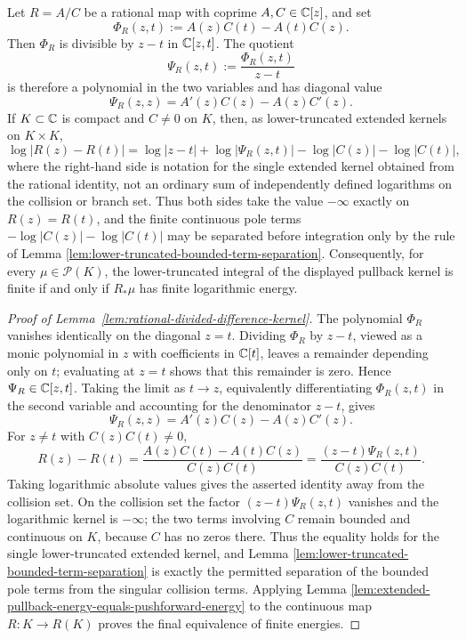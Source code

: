 \begin{lemma}\label{lem:rational-divided-difference-kernel}
Let \(R=A/C\) be a rational map with coprime \(A,C\in\mathbb{C}[z]\), and set
\[
\Phi_R(z,t):=A(z)C(t)-A(t)C(z).
\]
Then \(\Phi_R\) is divisible by \(z-t\) in \(\mathbb{C}[z,t]\).  The quotient
\[
\Psi_R(z,t):=\frac{\Phi_R(z,t)}{z-t}
\]
is therefore a polynomial in the two variables and has diagonal value
\[
\Psi_R(z,z)=A'(z)C(z)-A(z)C'(z).
\]
If \(K\subset\mathbb{C}\) is compact and \(C\ne0\) on \(K\), then, as lower-truncated extended kernels on \(K\times K\),
\[
\log|R(z)-R(t)|
=
\log|z-t|+\log|\Psi_R(z,t)|-
\log|C(z)|-\log|C(t)|,
\]
where the right-hand side is notation for the single extended kernel obtained from the rational identity, not an ordinary sum of independently defined logarithms on the collision or branch set.  Thus both sides take the value \(-\infty\) exactly on \(R(z)=R(t)\), and the finite continuous pole terms \(-\log|C(z)|-\log|C(t)|\) may be separated before integration only by the rule of Lemma \ref{lem:lower-truncated-bounded-term-separation}.  Consequently, for every \(\mu\in\mathcal P(K)\), the lower-truncated integral of the displayed pullback kernel is finite if and only if \(R_\ast\mu\) has finite logarithmic energy.
\end{lemma}

\begin{proof}[Proof of Lemma~\ref{lem:rational-divided-difference-kernel}]
The polynomial \(\Phi_R\) vanishes identically on the diagonal \(z=t\).  Dividing \(\Phi_R\) by \(z-t\), viewed as a monic polynomial in \(z\) with coefficients in \(\mathbb{C}[t]\), leaves a remainder depending only on \(t\); evaluating at \(z=t\) shows that this remainder is zero.  Hence \(\Psi_R\in\mathbb{C}[z,t]\).  Taking the limit as \(t\to z\), equivalently differentiating \(\Phi_R(z,t)\) in the second variable and accounting for the denominator \(z-t\), gives
\[
\Psi_R(z,z)=A'(z)C(z)-A(z)C'(z).
\]
For \(z\ne t\) with \(C(z)C(t)\ne0\),
\[
R(z)-R(t)=\frac{A(z)C(t)-A(t)C(z)}{C(z)C(t)}
=\frac{(z-t)\Psi_R(z,t)}{C(z)C(t)}.
\]
Taking logarithmic absolute values gives the asserted identity away from the collision set.  On the collision set the factor \((z-t)\Psi_R(z,t)\) vanishes and the logarithmic kernel is \(-\infty\); the two terms involving \(C\) remain bounded and continuous on \(K\), because \(C\) has no zeros there.  Thus the equality holds for the single lower-truncated extended kernel, and Lemma \ref{lem:lower-truncated-bounded-term-separation} is exactly the permitted separation of the bounded pole terms from the singular collision terms.  Applying Lemma \ref{lem:extended-pullback-energy-equals-pushforward-energy} to the continuous map \(R:K\to R(K)\) proves the final equivalence of finite energies.
\end{proof}

